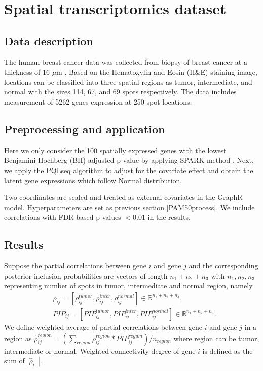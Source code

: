 \documentclass[
]{book}
\begin{document}
\hypertarget{ST}{%
\chapter{Spatial transcriptomics dataset}\label{ST}}

\hypertarget{STdata}{%
\section{Data description}\label{STdata}}

The human breast cancer data was collected from biopsy of breast cancer at a thickness of 16 \(\mu\)m \citep{staahl2016visualization}. Based on the Hematoxylin and Eosin (H\&E) staining image, locations can be classified into three spatial regions as tumor, intermediate, and normal with the sizes 114, 67, and 69 spots respectively. The data includes measurement of 5262 genes expression at 250 spot locations.

\hypertarget{STprocess}{%
\section{Preprocessing and application}\label{STprocess}}

Here we only consider the 100 spatially expressed genes with the lowest Benjamini-Hochberg (BH) adjusted p-value by applying SPARK method \citep{sun2020statistical}. Next, we apply the PQLseq \citep{sun2019heritability} algorithm to adjust for the covariate effect and obtain the latent gene expressions which follow Normal distribution.

Two coordinates are scaled and treated as external covariates in the GraphR model. Hyperparameters are set as previous section \ref{PAM50process}. We include correlations with FDR based p-values \(<0.01\) in the results.

\hypertarget{STBCresult}{%
\section{Results}\label{STBCresult}}

Suppose the partial correlations between gene \(i\) and gene \(j\) and the corresponding posterior inclusion probabilities are vectors of length \(n_1+n_2+n_3\) with \(n_1,n_2,n_3\) representing number of spots in tumor, intermediate and normal region, namely
\begin{equation}
\begin{split}
& \rho_{ij} = [\rho_{ij}^{tumor}, \rho_{ij}^{inter}, \rho_{ij}^{normal}] \in \mathbb{R}^{n_1+n_2+n_3}, \\
& PIP_{ij} = [PIP_{ij}^{tumor}, PIP_{ij}^{inter}, PIP_{ij}^{normal}] \in \mathbb{R}^{n_1+n_2+n_3}.
\end{split}
\end{equation}
We define weighted average of partial correlations between gene \(i\) and gene \(j\) in a region as \(\hat{\rho}_{ij}^{region}= (\sum_{region} \rho_{ij}^{region} * PIP_{ij}^{region})/n_{region}\) where region can be tumor, intermediate or normal. Weighted connectivity degree of gene \(i\) is defined as the sum of \(|\hat{\rho}_{i\cdot}|\).
\end{document}

